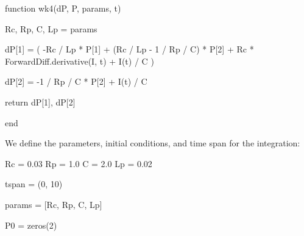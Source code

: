 \documentclass[
  a4paper,
  DIV=11,
  numbers=noendperiod,
  oneside]{scrreprt}
\newenvironment{Shaded}{\begin{snugshade}}{\end{snugshade}}
\newcommand{\ControlFlowTok}[1]{\textcolor[rgb]{0.00,0.23,0.31}{#1}}
\newcommand{\FloatTok}[1]{\textcolor[rgb]{0.68,0.00,0.00}{#1}}
\newcommand{\FunctionTok}[1]{\textcolor[rgb]{0.28,0.35,0.67}{#1}}
\newcommand{\KeywordTok}[1]{\textcolor[rgb]{0.00,0.23,0.31}{#1}}
\newcommand{\NormalTok}[1]{\textcolor[rgb]{0.00,0.23,0.31}{#1}}
\newcommand{\OperatorTok}[1]{\textcolor[rgb]{0.37,0.37,0.37}{#1}}
\begin{document}
\begin{Shaded}
\begin{Highlighting}[]
\KeywordTok{function} \FunctionTok{wk4}\NormalTok{(dP, P, params, t)}

\NormalTok{    Rc, Rp, C, Lp }\OperatorTok{=}\NormalTok{ params}

\NormalTok{    dP[}\FloatTok{1}\NormalTok{] }\OperatorTok{=}\NormalTok{ (}
        \OperatorTok{{-}}\NormalTok{Rc }\OperatorTok{/}\NormalTok{ Lp }\OperatorTok{*}\NormalTok{ P[}\FloatTok{1}\NormalTok{]}
        \OperatorTok{+}\NormalTok{ (Rc }\OperatorTok{/}\NormalTok{ Lp }\OperatorTok{{-}} \FloatTok{1} \OperatorTok{/}\NormalTok{ Rp }\OperatorTok{/}\NormalTok{ C) }\OperatorTok{*}\NormalTok{ P[}\FloatTok{2}\NormalTok{]}
        \OperatorTok{+}\NormalTok{ Rc }\OperatorTok{*}\NormalTok{ ForwardDiff.}\FunctionTok{derivative}\NormalTok{(I, t)}
        \OperatorTok{+} \FunctionTok{I}\NormalTok{(t) }\OperatorTok{/}\NormalTok{ C}
\NormalTok{        )}

\NormalTok{    dP[}\FloatTok{2}\NormalTok{] }\OperatorTok{=} \OperatorTok{{-}}\FloatTok{1} \OperatorTok{/}\NormalTok{ Rp }\OperatorTok{/}\NormalTok{ C }\OperatorTok{*}\NormalTok{ P[}\FloatTok{2}\NormalTok{] }\OperatorTok{+} \FunctionTok{I}\NormalTok{(t) }\OperatorTok{/}\NormalTok{ C}

    \ControlFlowTok{return}\NormalTok{ dP[}\FloatTok{1}\NormalTok{], dP[}\FloatTok{2}\NormalTok{]}

\KeywordTok{end}
\end{Highlighting}
\end{Shaded}

We define the parameters, initial conditions, and time span for the
integration:

\begin{Shaded}
\begin{Highlighting}[]
\NormalTok{Rc }\OperatorTok{=} \FloatTok{0.03}
\NormalTok{Rp }\OperatorTok{=} \FloatTok{1.0}
\NormalTok{C  }\OperatorTok{=} \FloatTok{2.0}
\NormalTok{Lp }\OperatorTok{=} \FloatTok{0.02}

\NormalTok{tspan }\OperatorTok{=}\NormalTok{ (}\FloatTok{0}\NormalTok{, }\FloatTok{10}\NormalTok{)}

\NormalTok{params }\OperatorTok{=}\NormalTok{ [Rc, Rp, C, Lp]}

\NormalTok{P0 }\OperatorTok{=} \FunctionTok{zeros}\NormalTok{(}\FloatTok{2}\NormalTok{)}
\end{Highlighting}
\end{Shaded}
\end{document}
